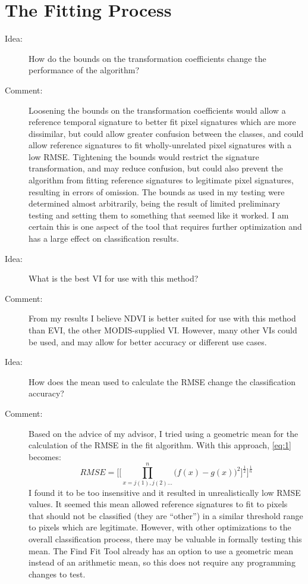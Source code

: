 \section{The Fitting Process}
\label{appendix:future:fitting}

\begin{description}
\item[Idea:] How do the bounds on the transformation coefficients change the performance of the algorithm?

\item[Comment:] Loosening the bounds on the transformation coefficients would allow a reference temporal signature to better fit pixel signatures which are more dissimilar, but could allow greater confusion between the classes, and could allow reference signatures to fit wholly-unrelated pixel signatures with a low RMSE. Tightening the bounds would restrict the signature transformation, and may reduce confusion, but could also prevent the algorithm from fitting reference signatures to legitimate pixel signatures, resulting in errors of omission. The bounds as used in my testing were determined  almost arbitrarily, being the result of limited preliminary testing and setting them to something that seemed like it worked. I am certain this is one aspect of the tool that requires further optimization and has a large effect on classification results.

\item[Idea:] What is the best VI for use with this method?

\item[Comment:] From my results I believe NDVI is better suited for use with this method than EVI, the other MODIS-supplied VI. However, many other VIs could be used, and may allow for better accuracy or different use cases.

\item[Idea:] How does the mean used to calculate the RMSE change the classification accuracy?

\item[Comment:] Based on the advice of my advisor, I tried using a geometric mean for the calculation of the RMSE in the fit algorithm. With this approach, \autoref{eq:1} becomes:
\begin{equation}
\label{eq:geometricmean}
  RMSE = \Biggl[\biggl[\prod_{x=j(1), j(2)...}^{n}\bigl(f\left(x\right)-g\left(x\right)\bigr)^{2}\biggr]^{\frac{1}{2}}\Biggr]^{\frac{1}{n}}
\end{equation}
I found it to be too insensitive and it resulted in unrealistically low RMSE values. It seemed this mean allowed reference signatures to fit to pixels that should not be classified (they are “other”) in a similar threshold range to pixels which are legitimate. However, with other optimizations to the overall classification process, there may be valuable in formally testing this mean. The Find Fit Tool already has an option to use a geometric mean instead of an arithmetic mean, so this does not require any programming changes to test.


\end{description}
